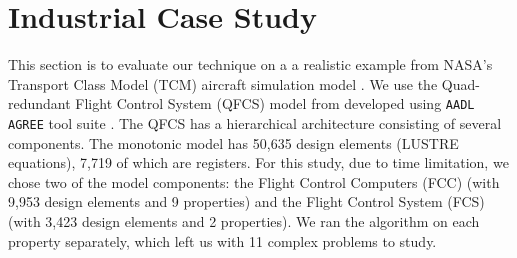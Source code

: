 \section{Industrial Case Study}

\label{sec:qfc} 
 
This section is to evaluate our technique on a a realistic example from NASA's Transport Class Model (TCM) aircraft simulation model \cite{hueschen2011development}. We use the Quad-redundant Flight Control System (QFCS) model from \cite{NFM2015:backes} developed using \texttt{AADL AGREE}
tool suite \cite{NFM2012:CoGa}. 
The QFCS has a hierarchical architecture consisting of several components. 
The monotonic model has 50,635 design elements (LUSTRE equations), 7,719 of which are registers. 
For this study, due to time limitation, we chose two of the model components: 
the Flight Control Computers (FCC) (with 9,953 design elements 
and 9 properties) and the Flight Control System (FCS) (with 3,423 design elements and 2 properties). 
We ran the algorithm on each property separately, which left us with 11 complex problems to study.  

 
  